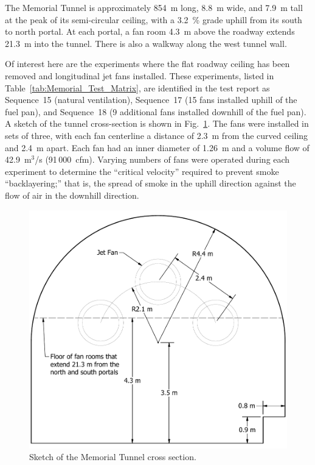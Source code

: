 The Memorial Tunnel is approximately 854~m long, 8.8~m wide, and 7.9~m tall at the peak of its semi-circular ceiling, with a 3.2~\% grade uphill from its south to north portal. At each portal, a fan room 4.3~m above the roadway extends 21.3~m into the tunnel. There is also a walkway along the west tunnel wall.

Of interest here are the experiments where the flat roadway ceiling has been removed and longitudinal jet fans installed. These experiments, listed in Table~\ref{tab:Memorial_Test_Matrix}, are identified in the test report as Sequence~15 (natural ventilation), Sequence~17 (15 fans installed uphill of the fuel pan), and Sequence~18 (9 additional fans installed downhill of the fuel pan). A sketch of the tunnel cross-section is shown in Fig.~\ref{Memorial_Tunnel_Cross_Section}.  The fans were installed in sets of three, with each fan centerline a distance of 2.3~m from the curved ceiling and 2.4~m apart. Each fan had an inner diameter of 1.26~m and a volume flow of 42.9~m$^3$/s (91\,000~cfm). Varying numbers of fans were operated during each experiment to determine the ``critical velocity'' required to prevent smoke ``backlayering;'' that is, the spread of smoke in the uphill direction against the flow of air in the downhill direction. 

\begin{figure}[!ht]
\centering
\includegraphics[width=5in]{FIGURES/Memorial_Tunnel/section}
\caption[Memorial Tunnel cross section]{Sketch of the Memorial Tunnel cross section.}
\label{Memorial_Tunnel_Cross_Section}
\end{figure}

